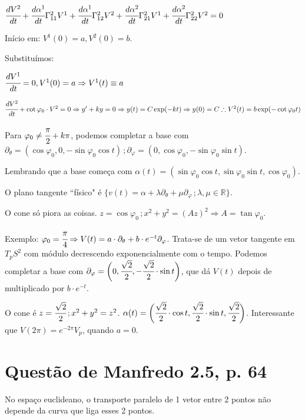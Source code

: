 \documentclass[12pt]{article}
\begin{document}
		$\cfrac{dV^2}{dt} + \cfrac{d\alpha^1}{dt} \Gamma_{11}^2 V^1  + \cfrac{d\alpha^1}{dt} \Gamma_{12}^2 V^2  + \cfrac{d\alpha^2}{dt} \Gamma_{21}^2 V^1  + \cfrac{d\alpha^2}{dt} \Gamma_{22}^2 V^2 = 0$

		In\'icio em: $V^1(0) = a, V^2(0) = b$.

		Substitu\'imos:

		$\cfrac{dV^1}{dt} = 0, V^1(0) = a \Rightarrow V^1(t) \equiv a$

		$\cfrac{dV^2}{dt} + \cot \varphi_0 \cdot V^2 = 0 \Rightarrow y' + ky = 0 \Rightarrow y(t) = C \exp(-kt) \Rightarrow y(0) = C \therefore V^2(t) = b \exp (-\cot \varphi_0 t)$

		Para $\varphi_0 \ne \cfrac{\pi}{2} + k\pi$, podemos completar a base com $\partial_\theta = (\cos \varphi_0, 0, -\sin \varphi_0 \cos t)\,; \partial_\varphi = (0, \cos \varphi_0, -\sin \varphi_0 \sin t)$.

		Lembrando que a base come\c{c}a com $\alpha(t) = (\sin \varphi_0 \cos t, \sin \varphi_0 \sin t, \cos \varphi_0)$.

		O plano tangente ``f\'isico" \'e $\{ v(t) = \alpha + \lambda \partial_\theta + \mu \partial_\varphi \,; \lambda, \mu \in \mathbb{R} \}$.

		O cone s\'o piora as coisas. $z = \cos \varphi_0\,; x^2 + y^2 = (A z)^2 \Rightarrow A = \tan \varphi_0$.

		Exemplo: $\varphi_0 = \cfrac{\pi}{4} \Rightarrow V(t) = a \cdot \partial_\theta + b \cdot e^{-t} \partial_\varphi$. Trata-se de um vetor tangente em $T_pS^2$ com m\'odulo decrescendo exponencialmente com o tempo. Podemos completar a base com $\partial_\varphi = \bigg(0, \cfrac{\sqrt 2}{2}, -\cfrac{\sqrt 2}{2} \cdot \sin t\bigg)$, que d\'a $V(t)$ depois de multiplicado por $b \cdot e^{-t}$.

		O cone \'e $z = \cfrac{\sqrt 2}{2}\,; x^2 + y^2 = z^2$. $\alpha(t) = \bigg(\cfrac{\sqrt 2}{2}\cdot \cos t, \cfrac{\sqrt 2}{2}\cdot \sin t, \cfrac{\sqrt 2}{2}\bigg)$. Interessante que $V(2\pi) = e^{-2\pi} V_p$, quando $a = 0$.

	\section{Quest\~ao de Manfredo 2.5, p. 64}
		\begin{flushright}
		\end{flushright}

		No espa\c{c}o euclideano, o transporte paralelo de 1 vetor entre 2 pontos n\~ao depende da curva que liga esses 2 pontos.
\end{document}
